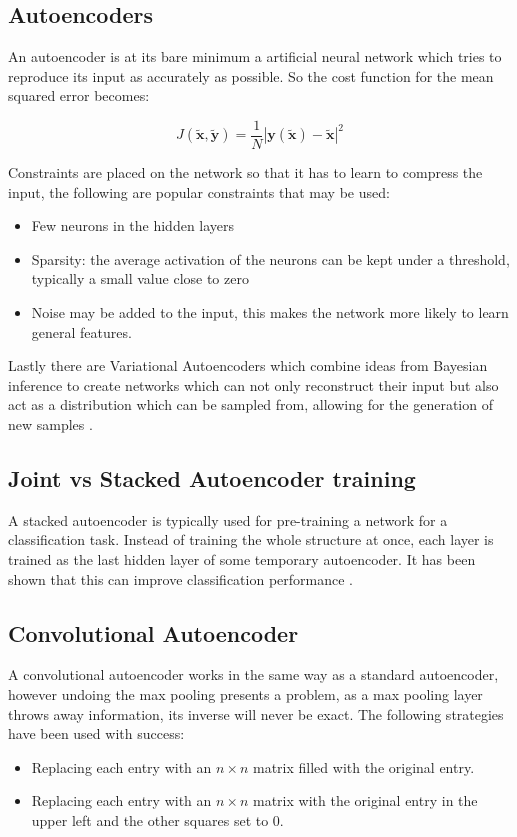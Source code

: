     \subsection{Autoencoders}
      An autoencoder is at its bare minimum a artificial neural network which tries
      to reproduce its input as accurately as possible. So the cost function for the mean squared error becomes:

      \begin{equation} \label{eq:autoencoder_cost}
        J(\tilde{\mathbf{x}},\tilde{\mathbf{y}}) = \frac{1}{N}\left |\mathbf{y}(\tilde{\mathbf{x}})-\tilde{\mathbf{x}}\right | ^2
      \end{equation}

      Constraints are
      placed on the network so that it has to learn to compress the input, the following
      are popular constraints that may be used:
      \begin{itemize}
        \item Few neurons in the hidden layers
        \item Sparsity: the average activation of the neurons can be kept under a
        threshold, typically a small value close to zero \cite{autong}
        \item Noise may be added to the input, this makes the network more likely
        to learn general features.
      \end{itemize}
      Lastly there are Variational Autoencoders which combine ideas from Bayesian inference
      to create networks which can not only reconstruct their input but also act as a
      distribution which can be sampled from, allowing for the generation of new samples \cite{Kingma2013}.

    \subsection{Joint vs Stacked Autoencoder training}
      A stacked autoencoder is typically used for pre-training a network for a classification task.
      Instead of training the whole structure at once, each layer is trained as the last hidden
      layer of some temporary autoencoder. It has been shown that this can improve classification performance \cite{stacks}.
    \subsection{Convolutional Autoencoder}
      A convolutional autoencoder works in the same way as a standard autoencoder, however
      undoing the max pooling presents a problem, as a max pooling layer throws away
      information, its inverse will never be exact. The following strategies have been
      used with success:
      \begin{itemize}
        \item Replacing each entry with an $n \times n$ matrix filled with the original
        entry.
        \item Replacing each entry with an  $n\times n$  matrix with
        the original entry in the upper left and the other squares set to 0. \cite{Dosovitskiy2015}
      \end{itemize}


